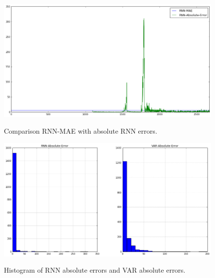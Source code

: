\begin{figure}[bth]
  \myfloatalign
  {\includegraphics[width=1\linewidth]
    {gfx/comparison-rnn-mae-with-rnn-absolute-error}}
  \caption{Comparison RNN-MAE with  absolute RNN errors.}
  \label{fig:comparison-var-mae-with-var-absolute-error}
\end{figure}

\begin{figure}[bth]
  \myfloatalign
  {\includegraphics[width=1\linewidth]
    {gfx/comparison-histogram-prediction-errors}}
  \caption{Histogram of RNN absolute errors and VAR absolute errors.}
  \label{fig:comparison-histogram-prediction-errors}
\end{figure}




